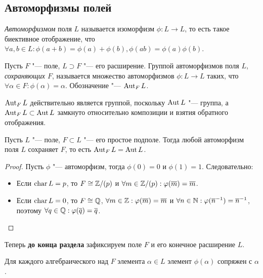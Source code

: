 \subsection{Автоморфизмы полей}

\begin{definition}
	\textit{Автоморфизмом} поля $L$ называется изоморфизм $\phi: L \to L$, то есть такое биективное отображение, что $\forall a, b \in L: \phi(a + b) = \phi(a) + \phi(b), \phi(ab) = \phi(a)\phi(b)$.
\end{definition}

\begin{definition}
	Пусть $F$ "--- поле, $L \supset F$ "--- его расширение. Группой автоморфизмов поля $L$, \textit{сохраняющих $F$}, называется множество автоморфизмов $\phi : L \to L$ таких, что $\forall \alpha \in F: \phi(\alpha) = \alpha$. Обозначение "--- $\operatorname{Aut}_F{L}$.
\end{definition}

\begin{note}
	$\operatorname{Aut}_F{L}$ действительно является группой, поскольку $\operatorname{Aut}{L}$ "--- группа, а $\operatorname{Aut}_F{L} \subset \operatorname{Aut}{L}$ замкнуто относительно композиции и взятия обратного отображения.
\end{note}

\begin{proposition}
	Пусть $L$ "--- поле, $F \subset L$ "--- его простое подполе. Тогда любой автоморфизм поля $L$ сохраняет $F$, то есть $\operatorname{Aut}_F{L} = \operatorname{Aut}{L}$.
\end{proposition}

\begin{proof}
	Пусть $\phi$ "--- автоморфизм, тогда $\phi(0) = 0$ и $\phi(1) = 1$. Следовательно:
	\begin{itemize}
		\item Если $\operatorname{char}{L} = p$, то $F \cong \mathbb{Z}/(p)$ и $\forall m \in \mathbb{Z}/(p): \varphi(\overline{m}) = \overline{m}$.
		\item Если $\operatorname{char}{L} = 0$, то $F \cong \mathbb{Q}$, $\forall m \in \mathbb{Z}: \varphi(\overline{m}) = \overline{m}$ и $\forall n \in \mathbb{N}: \varphi(\overline{n}^{-1}) = \overline{n}^{-1}$, поэтому $\forall q \in \mathbb{Q}: \varphi(\overline{q}) = \overline{q}$.\qedhere
	\end{itemize}
\end{proof}

Теперь \textbf{до конца раздела} зафиксируем поле $F$ и его конечное расширение $L$.

\begin{proposition}
	Для каждого алгебраического над $F$ элемента $\alpha \in L$ элемент $\phi(\alpha)$ сопряжен с $\alpha$.
\end{proposition}

